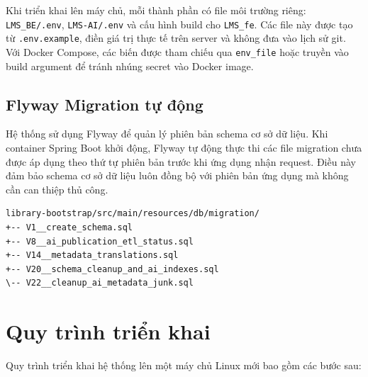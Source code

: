 Khi triển khai lên máy chủ, mỗi thành phần có file môi trường riêng:
\texttt{LMS\_BE/.env}, \texttt{LMS-AI/.env} và cấu hình build cho
\texttt{LMS\_fe}. Các file này được tạo từ \texttt{.env.example}, điền giá trị
thực tế trên server và không đưa vào lịch sử git. Với Docker Compose, các biến
được tham chiếu qua \texttt{env\_file} hoặc truyền vào build argument để tránh
nhúng secret vào Docker image.

\subsection{Flyway Migration tự động}

Hệ thống sử dụng Flyway để quản lý phiên bản schema cơ sở dữ liệu. Khi
container Spring Boot khởi động, Flyway tự động thực thi các file migration
chưa được áp dụng theo thứ tự phiên bản trước khi ứng dụng nhận request.
Điều này đảm bảo schema cơ sở dữ liệu luôn đồng bộ với phiên bản ứng dụng
mà không cần can thiệp thủ công.

\begin{verbatim}
library-bootstrap/src/main/resources/db/migration/
+-- V1__create_schema.sql
+-- V8__ai_publication_etl_status.sql
+-- V14__metadata_translations.sql
+-- V20__schema_cleanup_and_ai_indexes.sql
\-- V22__cleanup_ai_metadata_junk.sql
\end{verbatim}

\section{Quy trình triển khai}

Quy trình triển khai hệ thống lên một máy chủ Linux mới bao gồm các bước sau:

